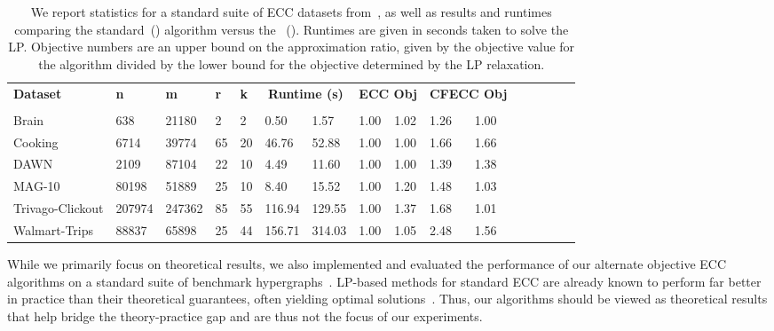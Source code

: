 \begin{table}[t]
    \centering
    \caption{We report statistics for a standard suite of ECC datasets from~\cite{amburg2020clustering,veldt2023optimal}, as well as results and runtimes comparing the standard~(\algecc{}) \minecc{} algorithm versus the \cfminECC{}~(\algcf{}). Runtimes are given in seconds taken to solve the LP. Objective numbers are an upper bound on the approximation ratio, given by the objective value for the algorithm divided by the lower bound for the objective determined by the LP relaxation.}
    \label{tab:cfecc_experiments}
    \begin{tabular}{ llllllllllllllll }
        \toprule
        \multirow{2}{*}{\textbf{Dataset}} & \multirow{2}{*}{\textbf{n}} & \multirow{2}{*}{\textbf{m}} & \multirow{2}{*}{\textbf{r}} & \multirow{2}{*}{\textbf{k}} & \multicolumn{2}{c}{\textbf{Runtime (s)}} & \multicolumn{2}{c}{\textbf{ECC Obj}} & \multicolumn{2}{c}{\textbf{CFECC Obj}} \\
        \cmidrule(lr){6-7} \cmidrule(lr){8-9} \cmidrule(lr){10-11}
         & & & & & \multicolumn{1}{c}{\algecc{}} & \multicolumn{1}{c}{\algcf{}} & \multicolumn{1}{c}{\algecc{}} & \multicolumn{1}{c}{\algcf{}} & \multicolumn{1}{c}{\algecc{}} & \multicolumn{1}{c}{\algcf{}} \\
        \cmidrule(lr){1-11}
        Brain            & 638    & 21180  & 2  & 2  & 0.50   & 1.57   & 1.00 & 1.02 & 1.26 & 1.00 \\
        Cooking          & 6714   & 39774  & 65 & 20 & 46.76  & 52.88  & 1.00 & 1.00 & 1.66 & 1.66 \\
        DAWN             & 2109   & 87104  & 22 & 10 & 4.49   & 11.60  & 1.00 & 1.00 & 1.39 & 1.38 \\
        MAG-10           & 80198  & 51889  & 25 & 10 & 8.40   & 15.52  & 1.00 & 1.20 & 1.48 & 1.03 \\
        Trivago-Clickout & 207974 & 247362 & 85 & 55 & 116.94 & 129.55 & 1.00 & 1.37 & 1.68 & 1.01 \\
        Walmart-Trips    & 88837  & 65898  & 25 & 44 & 156.71 & 314.03 & 1.00 & 1.05 & 2.48 & 1.56 \\
        \bottomrule
    \end{tabular}
\end{table}


While we primarily focus on theoretical results, we also implemented and evaluated the performance of our alternate objective ECC algorithms on a standard suite of benchmark hypergraphs~\cite{veldt2023optimal,amburg2020clustering}.
LP-based methods for standard ECC are already known to perform far better in practice than their theoretical guarantees, often yielding optimal solutions~\cite{amburg2020clustering}. Thus, our \maxecc{} algorithms should be viewed as theoretical results that help bridge the theory-practice gap and are thus not the focus of our experiments.

